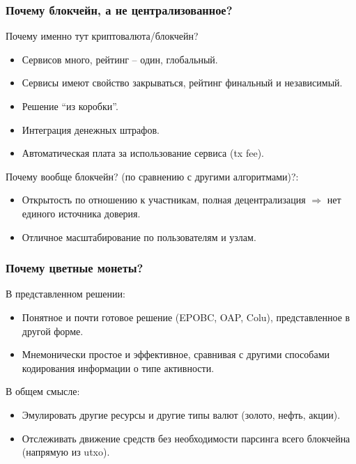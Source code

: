 \documentclass[11pt,handout,pdf,hyperref={unicode}]{beamer}
\begin{document}
\begin{frame}
  \frametitle{Почему блокчейн, а не централизованное?}

  Почему именно тут криптовалюта/блокчейн?
  \begin{itemize}
  \item Сервисов много, рейтинг -- один, глобальный.
  \item Сервисы имеют свойство закрываться, рейтинг финальный и независимый.
  \item Решение ``из коробки''.
  \item Интеграция денежных штрафов.
  \item Автоматическая плата за использование сервиса (tx fee).
  \end{itemize}

  Почему вообще блокчейн? (по сравнению с другими алгоритмами)?:
  \begin{itemize}
  \item Открытость по отношению к участникам, полная децентрализация
    $\Rightarrow$ нет единого источника доверия.
  \item Отличное масштабирование по пользователям и
    узлам. \parencite{powbftquest}
  \end{itemize}
\end{frame}

\begin{frame}
  \frametitle{Почему цветные монеты?}

  В представленном решении:
  \begin{itemize}
  \item Понятное и почти готовое решение (EPOBC, OAP, Colu),
    представленное в другой форме.
  \item Мнемонически простое и эффективное, сравнивая с другими
    способами кодирования информации о типе активности.
  \end{itemize}

  В общем смысле:
  \begin{itemize}
  \item Эмулировать другие ресурсы и другие типы валют (золото, нефть,
    акции).
  \item Отслеживать движение средств без необходимости парсинга всего
    блокчейна (напрямую из utxo).
  \end{itemize}
\end{frame}
\end{document}
